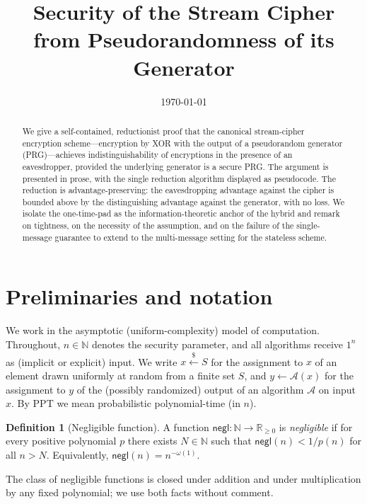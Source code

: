 \documentclass[11pt]{article}
\title{\bf Security of the Stream Cipher \\ from Pseudorandomness of its Generator}
\author{}
\date{\today}
\theoremstyle{plain}
\theoremstyle{definition}
\newtheorem{definition}{Definition}
\newcommand{\secp}{n}                       %
\newcommand{\adv}{\mathcal{A}}
\newcommand{\negl}{\mathsf{negl}}
\newcommand{\PPT}{\mathrm{PPT}}
\newcommand{\getsr}{\overset{\$}{\leftarrow}}   %
\begin{document}
\maketitle

\begin{abstract}
We give a self-contained, reductionist proof that the canonical stream-cipher
encryption scheme---encryption by XOR with the output of a pseudorandom
generator (PRG)---achieves indistinguishability of encryptions in the presence
of an eavesdropper, provided the underlying generator is a secure PRG. The
argument is presented in prose, with the single reduction algorithm displayed as
pseudocode. The reduction is advantage-preserving: the eavesdropping advantage
against the cipher is bounded above by the distinguishing advantage against the
generator, with no loss. We isolate the one-time-pad as the information-theoretic
anchor of the hybrid and remark on tightness, on the necessity of the
assumption, and on the failure of the single-message guarantee to extend to the
multi-message setting for the stateless scheme.
\end{abstract}

\section{Preliminaries and notation}

We work in the asymptotic (uniform-complexity) model of computation. Throughout,
$\secp \in \mathbb{N}$ denotes the security parameter, and all algorithms receive
$1^\secp$ as (implicit or explicit) input. We write $x \getsr S$ for the
assignment to $x$ of an element drawn uniformly at random from a finite set $S$,
and $y \leftarrow \adv(x)$ for the assignment to $y$ of the (possibly
randomized) output of an algorithm $\adv$ on input $x$. By $\PPT$ we mean
probabilistic polynomial-time (in $\secp$).

\begin{definition}[Negligible function]
A function $\negl \colon \mathbb{N} \to \mathbb{R}_{\geq 0}$ is \emph{negligible}
if for every positive polynomial $p$ there exists $N \in \mathbb{N}$ such that
$\negl(\secp) < 1/p(\secp)$ for all $\secp > N$. Equivalently,
$\negl(\secp) = \secp^{-\omega(1)}$.
\end{definition}

The class of negligible functions is closed under addition and under
multiplication by any fixed polynomial; we use both facts without comment.
\end{document}
